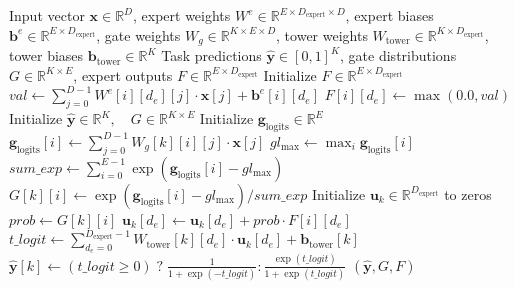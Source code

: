 \documentclass[11pt,a4paper]{article}
\theoremstyle{definition}
\begin{document}
\begin{algorithm}[H]
\caption{MMoE Multi-Task Expert Forward Pass and Task Routing}
\begin{algorithmic}[1]
\Require Input vector $\mathbf{x} \in \mathbb{R}^D$, expert weights $W^e \in \mathbb{R}^{E \times D_{\text{expert}} \times D}$, expert biases $\mathbf{b}^e \in \mathbb{R}^{E \times D_{\text{expert}}}$, gate weights $W_g \in \mathbb{R}^{K \times E \times D}$, tower weights $W_{\text{tower}} \in \mathbb{R}^{K \times D_{\text{expert}}}$, tower biases $\mathbf{b}_{\text{tower}} \in \mathbb{R}^K$
\Ensure Task predictions $\widehat{\mathbf{y}} \in [0, 1]^K$, gate distributions $G \in \mathbb{R}^{K \times E}$, expert outputs $F \in \mathbb{R}^{E \times D_{\text{expert}}}$
\State Initialize $F \in \mathbb{R}^{E \times D_{\text{expert}}}$
 
        \State $val \gets \sum_{j=0}^{D-1} W^e[i][d_e][j] \cdot \mathbf{x}[j] + \mathbf{b}^e[i][d_e]$
        \State $F[i][d_e] \gets \max(0.0, val)$
    \EndFor
\EndFor
\State Initialize $\widehat{\mathbf{y}} \in \mathbb{R}^K, \quad G \in \mathbb{R}^{K \times E}$
 
    \State Initialize $\mathbf{g}_{\text{logits}} \in \mathbb{R}^E$
        \State $\mathbf{g}_{\text{logits}}[i] \gets \sum_{j=0}^{D-1} W_g[k][i][j] \cdot \mathbf{x}[j]$
    \EndFor
    \State $gl_{\max} \gets \max_i \mathbf{g}_{\text{logits}}[i]$
    \State $sum\_exp \gets \sum_{i=0}^{E-1} \exp(\mathbf{g}_{\text{logits}}[i] - gl_{\max})$
        \State $G[k][i] \gets \exp(\mathbf{g}_{\text{logits}}[i] - gl_{\max}) / sum\_exp$
    \EndFor
    \State Initialize $\mathbf{u}_k \in \mathbb{R}^{D_{\text{expert}}}$ to zeros
     
        \State $prob \gets G[k][i]$
            \State $\mathbf{u}_k[d_e] \gets \mathbf{u}_k[d_e] + prob \cdot F[i][d_e]$
        \EndFor
    \EndFor
    \State $t\_logit \gets \sum_{d_e=0}^{D_{\text{expert}}-1} W_{\text{tower}}[k][d_e] \cdot \mathbf{u}_k[d_e] + \mathbf{b}_{\text{tower}}[k]$
    \State $\widehat{\mathbf{y}}[k] \gets (t\_logit \ge 0) \;?\; \frac{1}{1 + \exp(-t\_logit)} : \frac{\exp(t\_logit)}{1 + \exp(t\_logit)}$
\EndFor
\State \Return $(\widehat{\mathbf{y}}, G, F)$
\end{algorithmic}
\end{algorithm}
\end{document}
